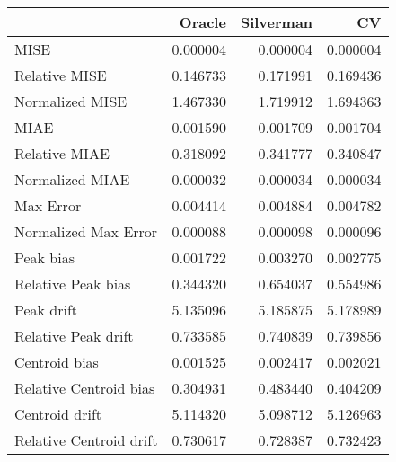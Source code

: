 \begin{tabular}{lrrr}
  \hline
 & Oracle & Silverman & CV \\ 
  \hline
MISE & 0.000004 & 0.000004 & 0.000004 \\ 
  Relative MISE & 0.146733 & 0.171991 & 0.169436 \\ 
  Normalized MISE & 1.467330 & 1.719912 & 1.694363 \\ 
  MIAE & 0.001590 & 0.001709 & 0.001704 \\ 
  Relative MIAE & 0.318092 & 0.341777 & 0.340847 \\ 
  Normalized MIAE & 0.000032 & 0.000034 & 0.000034 \\ 
  Max Error & 0.004414 & 0.004884 & 0.004782 \\ 
  Normalized Max Error & 0.000088 & 0.000098 & 0.000096 \\ 
  Peak bias & 0.001722 & 0.003270 & 0.002775 \\ 
  Relative Peak bias & 0.344320 & 0.654037 & 0.554986 \\ 
  Peak drift & 5.135096 & 5.185875 & 5.178989 \\ 
  Relative Peak drift & 0.733585 & 0.740839 & 0.739856 \\ 
  Centroid bias & 0.001525 & 0.002417 & 0.002021 \\ 
  Relative Centroid bias & 0.304931 & 0.483440 & 0.404209 \\ 
  Centroid drift & 5.114320 & 5.098712 & 5.126963 \\ 
  Relative Centroid drift & 0.730617 & 0.728387 & 0.732423 \\ 
   \hline
\end{tabular}

